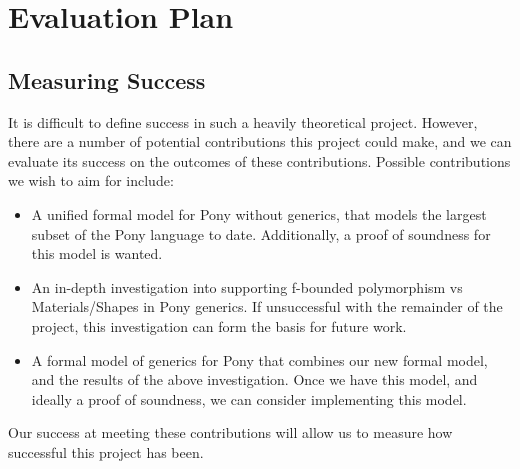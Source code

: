\chapter{Evaluation Plan}

\section{Measuring Success}

It is difficult to define success in such a heavily theoretical project. However, there are a number of potential contributions this project could make, and we can evaluate its success on the outcomes of these contributions. Possible contributions we wish to aim for include:

\begin{itemize}
    \item A unified formal model for Pony without generics, that models the largest subset of the Pony language to date. Additionally, a proof of soundness for this model is wanted.
    \item An in-depth investigation into supporting f-bounded polymorphism vs Materials/Shapes in Pony generics. If unsuccessful with the remainder of the project, this investigation can form the basis for future work.
    \item A formal model of generics for Pony that combines our new formal model, and the results of the above investigation. Once we have this model, and ideally a proof of soundness, we can consider implementing this model.
\end{itemize}

Our success at meeting these contributions will allow us to measure how successful this project has been.